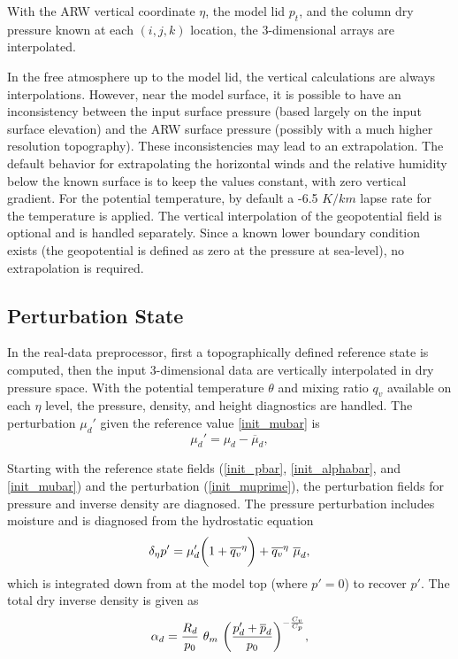\noindent
With the ARW vertical coordinate $\eta$, the model lid $p_{t}$, and the column dry
pressure known at each $(i,j,k)$ location, the 3-dimensional arrays are interpolated.

In the free atmosphere up to the model lid, the vertical calculations are always interpolations.
However, near the model surface, it is possible to have an inconsistency between the input
surface pressure (based largely on the input surface elevation) and the ARW surface
pressure (possibly with a much higher resolution topography).  These inconsistencies
may lead to an extrapolation.  The default behavior for extrapolating the horizontal winds and
the relative humidity below the known surface is to keep the values constant, with zero vertical gradient.
For the potential temperature, by default a -6.5 $K/km$ lapse rate for the temperature is applied.
The vertical interpolation of the geopotential field is optional and is
handled separately.  Since a known lower boundary condition exists  
(the geopotential is defined as zero at the pressure at sea-level), no extrapolation is required.



\subsection{Perturbation State}

In the real-data preprocessor, first a topographically defined reference state is computed, 
then the input 3-dimensional data are vertically
interpolated in dry pressure space. With the potential temperature $\theta$ and mixing ratio
$q_v$ available on each $\eta$ level, the pressure, density, and height diagnostics are
handled.
\noindent  The perturbation $\mu_d'$
given the reference value \eqref{init_mubar} is
\begin{equation}
\mu_d'  = \mu_d - \overline{\mu}_d,
\label{init_muprime}
\end{equation}

\noindent Starting with the reference state fields 
(\ref{init_pbar}, \ref{init_alphabar}, and \eqref{init_mubar}) and the perturbation (\ref{init_muprime}),
the perturbation fields for pressure and inverse density are diagnosed.
The pressure perturbation includes moisture and is diagnosed from 
the hydrostatic equation
%
\begin{equation}
\delta_{\eta} p' = \mu'_d \bigg(1 + {\overline{q_v}^\eta} \bigg) + 
                     \overline{q_v}^\eta~\overline \mu_d,
\notag
\end{equation}
%
\noindent 
which is
integrated down from 
at the model top (where $p'= 0$) to recover $p'$.
The total dry inverse density is given as
\begin{equation}
\alpha_d = {R_d \over p_{0} } ~ \theta_m~ 
                                        \bigg( {{p'_d + \overline {p}_d} \over p_{0} } \bigg )^{-{C_v \over C_p}},
\notag
\end{equation}


